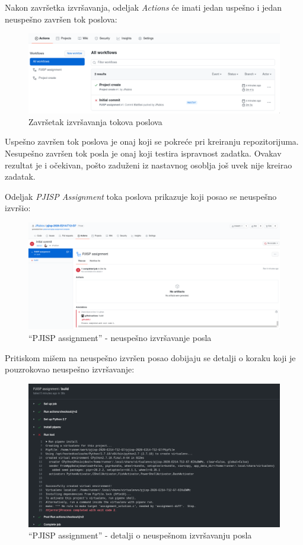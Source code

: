 \documentclass[12pt]{report}
\begin{document}
Nakon završetka izvršavanja, odeljak \textit{Actions} će imati jedan uspešno i jedan neuspešno završen tok poslova:

\begin{figure}[H]
    \centering
    \includegraphics[width=\linewidth]{images/9.png}
    \caption{Završetak izvršavanja tokova poslova}
\end{figure}

Uspešno završen tok poslova je onaj koji se pokreće pri kreiranju repozitorijuma. Nesupešno završen tok posla je onaj koji testira ispravnost zadatka. Ovakav rezultat je i očekivan, pošto zaduženi iz nastavnog osoblja još uvek nije kreirao zadatak.

Odeljak \textit{PJISP Assignment} toka poslova prikazuje koji posao se neuspešno izvršio:

\begin{figure}[H]
    \centering
    \includegraphics[width=\linewidth]{images/10.png}
    \caption{``PJISP assignment'' - neuspešno izvršavanje posla}
\end{figure}

Pritiskom mišem na neuspešno izvršen posao dobijaju se detalji o koraku koji je pouzrokovao neuspešno izvršavanje:

\begin{figure}[H]
    \centering
    \includegraphics[width=\linewidth]{images/11.png}
    \caption{``PJISP assignment'' - detalji o neuspešnom izvršavanju posla}
\end{figure}
\end{document}
